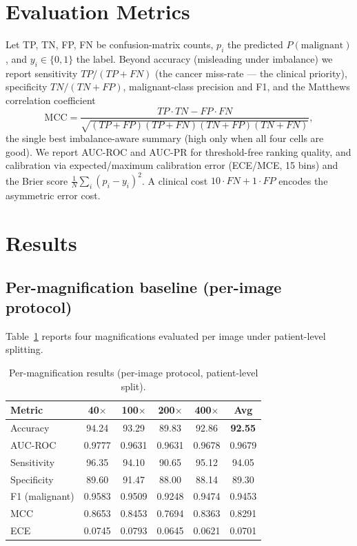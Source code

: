 \documentclass[11pt]{article}
\begin{document}
\section{Evaluation Metrics}
\label{sec:metrics}

Let TP, TN, FP, FN be confusion-matrix counts, $p_i$ the predicted $P(\text{malignant})$,
and $y_i\in\{0,1\}$ the label. Beyond accuracy (misleading under imbalance) we
report sensitivity $TP/(TP{+}FN)$ (the cancer miss-rate — the clinical priority),
specificity $TN/(TN{+}FP)$, malignant-class precision and F1, and the Matthews
correlation coefficient
\begin{equation}
\mathrm{MCC}=\frac{TP\cdot TN-FP\cdot FN}{\sqrt{(TP{+}FP)(TP{+}FN)(TN{+}FP)(TN{+}FN)}},
\end{equation}
the single best imbalance-aware summary (high only when all four cells are good).
We report AUC-ROC and AUC-PR for threshold-free ranking quality, and calibration
via expected/maximum calibration error (ECE/MCE, 15 bins) and the Brier score
$\frac1N\sum_i(p_i-y_i)^2$. A clinical cost $10\cdot FN+1\cdot FP$ encodes the
asymmetric error cost.

\section{Results}
\label{sec:results}

\subsection{Per-magnification baseline (per-image protocol)}
Table~\ref{tab:permag} reports four magnifications evaluated per image under
patient-level splitting.

\begin{table}[t]
\centering
\caption{Per-magnification results (per-image protocol, patient-level split).}
\label{tab:permag}
\small
\begin{tabular}{@{}lccccc@{}}
\toprule
Metric & 40$\times$ & 100$\times$ & 200$\times$ & 400$\times$ & Avg \\
\midrule
Accuracy      & 94.24 & 93.29 & 89.83 & 92.86 & \textbf{92.55} \\
AUC-ROC       & 0.9777 & 0.9631 & 0.9631 & 0.9678 & 0.9679 \\
Sensitivity   & 96.35 & 94.10 & 90.65 & 95.12 & 94.05 \\
Specificity   & 89.60 & 91.47 & 88.00 & 88.14 & 89.30 \\
F1 (malignant)& 0.9583 & 0.9509 & 0.9248 & 0.9474 & 0.9453 \\
MCC           & 0.8653 & 0.8453 & 0.7694 & 0.8363 & 0.8291 \\
ECE           & 0.0745 & 0.0793 & 0.0645 & 0.0621 & 0.0701 \\
\bottomrule
\end{tabular}
\end{table}
\end{document}
